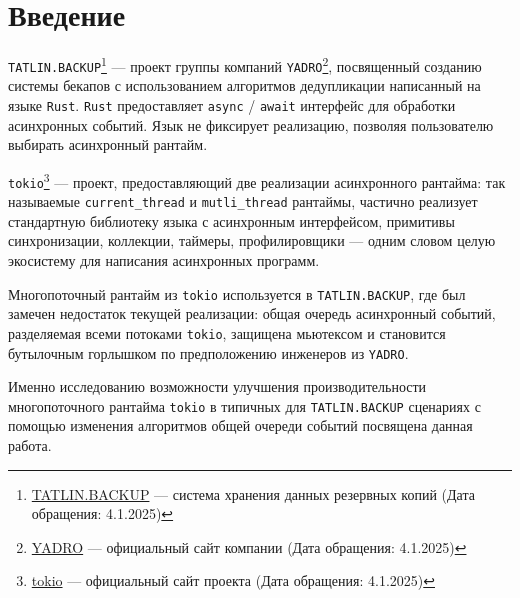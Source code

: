 
\section*{Введение}
\thispagestyle{withCompileDate}

\verb|TATLIN.BACKUP|\footnote{\href{https://yadro.com/ru/tatlin/backup}{TATLIN.BACKUP}
--- система хранения данных резервных копий (Дата обращения: 4.1.2025)} --- проект группы компаний \verb|YADRO|\footnote{\href{https://yadro.com/}{YADRO} --- официальный сайт компании (Дата обращения: 4.1.2025)}, посвященный созданию системы бекапов с использованием алгоритмов дедупликации написанный на языке \verb|Rust|. \verb|Rust| предоставляет \verb|async| / \verb|await|\cite{fsharpasyncawait} интерфейс для обработки асинхронных событий. Язык не фиксирует реализацию, позволяя пользователю выбирать асинхронный рантайм.

\verb|tokio|\footnote{\href{https://tokio.rs/}{tokio} --- официальный сайт проекта (Дата обращения: 4.1.2025)} --- проект, предоставляющий две реализации асинхронного рантайма: так называемые \verb|current_thread| и \verb|mutli_thread| рантаймы, частично реализует стандартную библиотеку языка с асинхронным интерфейсом, примитивы синхронизации, коллекции, таймеры, профилировщики --- одним словом целую экосистему для написания асинхронных программ.

Многопоточный рантайм из \verb|tokio| используется в \verb|TATLIN.BACKUP|, где был замечен недостаток текущей реализации: общая очередь асинхронный событий, разделяемая всеми потоками \verb|tokio|, защищена мьютексом и становится бутылочным горлышком по предположению инженеров из \verb|YADRO|.

Именно исследованию возможности улучшения производительности многопоточного рантайма \verb|tokio| в типичных для \verb|TATLIN.BACKUP| сценариях с помощью изменения алгоритмов общей очереди событий посвящена данная работа.
